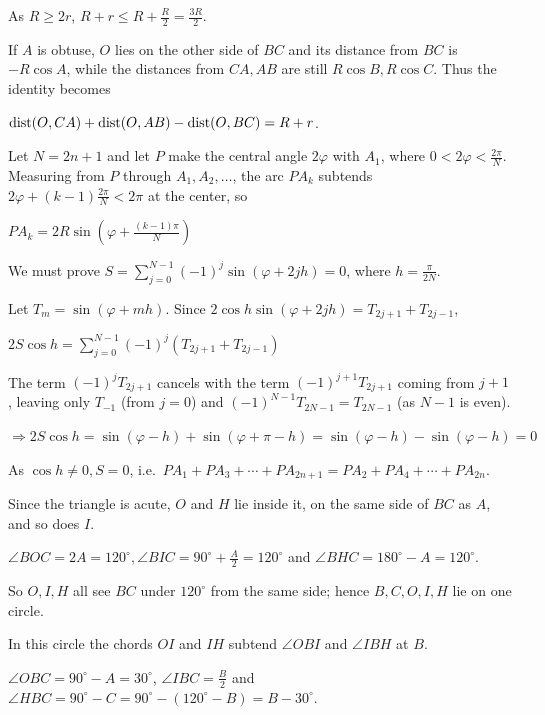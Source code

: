   As $R\geq 2r$, $R + r\leq R + \frac{R}{2} = \frac{3R}{2}$.

  If $A$ is obtuse, $O$ lies on the other side of $BC$ and its distance from $BC$ is $-R\cos A$, while the
  distances from $CA, AB$ are still $R\cos B, R\cos C$. Thus the identity becomes

  ${\rm dist}(O, CA) + {\rm dist}(O, AB) - {\rm dist}(O, BC) = R + r$.
\item Let $N = 2n + 1$ and let $P$ make the central angle $2\varphi$ with $A_1$, where $0 < 2\varphi <
  \frac{2\pi}{N}$. Measuring from $P$ through $A_1, A_2, \ldots$, the arc $PA_k$ subtends $2\varphi + (k -
  1)\frac{2\pi}{N} < 2\pi$ at the center, so

  $PA_k = 2R\sin\left(\varphi + \frac{(k - 1)\pi}{N}\right)$

  We must prove $S = \displaystyle\sum_{j = 0}^{N - 1}(-1)^j\sin(\varphi + 2jh) = 0$, where $h =
  \frac{\pi}{2N}$.

  Let $T_m = \sin(\varphi + mh)$. Since $2\cos h\sin(\varphi + 2jh) = T_{2j + 1} + T_{2j - 1}$,

  $2S\cos h = \displaystyle\sum_{j = 0}^{N - 1}(-1)^j(T_{2j + 1} + T_{2j - 1})$

  The term $(-1)^jT_{2j + 1}$ cancels with the term $(-1)^{j + 1}T_{2j + 1}$ coming from $j + 1$, leaving only
  $T_{-1}$ (from $j = 0$) and $(-1)^{N - 1}T_{2N - 1} = T_{2N - 1}$ (as $N - 1$ is even).

  $\Rightarrow 2S\cos h = \sin(\varphi - h) + \sin(\varphi + \pi - h) = \sin(\varphi - h) - \sin(\varphi - h) =
  0$

  As $\cos h\neq 0, S = 0$, i.e.\ $PA_1 + PA_3 + \cdots + PA_{2n + 1} = PA_2 + PA_4 + \cdots + PA_{2n}$.
\item Since the triangle is acute, $O$ and $H$ lie inside it, on the same side of $BC$ as $A$, and so does
  $I$.

  $\angle BOC = 2A = 120^\circ, \angle BIC = 90^\circ + \frac{A}{2} = 120^\circ$ and $\angle BHC = 180^\circ - A
  = 120^\circ$.

  So $O, I, H$ all see $BC$ under $120^\circ$ from the same side; hence $B, C, O, I, H$ lie on one circle.

  In this circle the chords $OI$ and $IH$ subtend $\angle OBI$ and $\angle IBH$ at $B$.

  $\angle OBC = 90^\circ - A = 30^\circ$, $\angle IBC = \frac{B}{2}$ and $\angle HBC = 90^\circ - C = 90^\circ -
  (120^\circ - B) = B - 30^\circ$.


